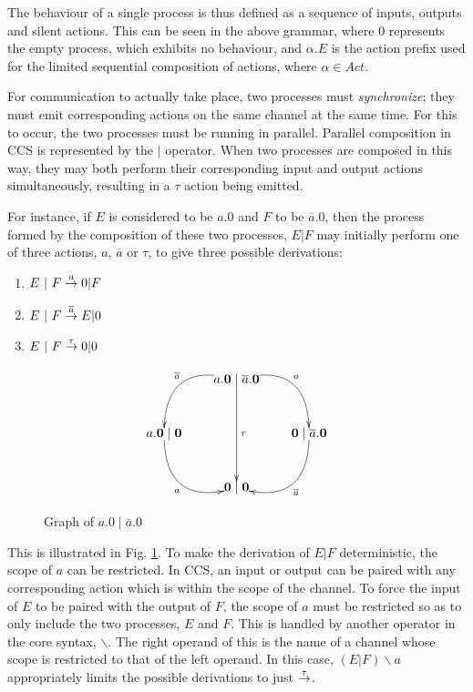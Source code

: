 The behaviour of a single process is thus defined as a sequence of
inputs, outputs and silent actions. This can be seen in the above
grammar, where $0$ represents the empty process, which exhibits no
behaviour, and $\alpha.E$ is the action prefix used for the limited
sequential composition of actions, where $\alpha \in Act$.

For communication to actually take place, two processes must
\emph{synchronize}; they must emit corresponding actions on the same
channel at the same time.  For this to occur, the two processes must be
running in parallel.  Parallel composition in CCS is represented by the
$|$ operator.  When two processes are composed in this way, they may
both perform their corresponding input and output actions
simultaneously, resulting in a $\tau$ action being emitted.

For instance, if $E$ is considered to be $a.0$ and $F$ to be
$\overline{a}.0$, then the process formed by the composition of these
two processes, $E|F$ may initially perform one of three actions, $a$,
$\overline{a}$ or $\tau$, to give three possible derivations:

\begin{enumerate}
\item $E\ |\ F \stackrel{a}{\rightarrow} 0|F$
\item $E\ |\ F \stackrel{\overline{a}}{\rightarrow} E|0$
\item $E\ |\ F \stackrel{\tau}{\rightarrow} 0|0$
\end{enumerate}

\begin{figure}  
  \centering
\[
\xy
(20,0)*{a.\nil \mid \overline{a}.\nil}="1";
(0,-15)*{a.\nil \mid \nil}="2";
(40,-15)*{\nil \mid \overline{a}.\nil}="3";
(20,-30)*{\nil \mid \nil}="4";
{\ar@/^2pc/^{a} "1";"3"};
{\ar@/_2pc/_{\overline{a}} "1";"2"};
{\ar@/^2pc/^{\overline{a}} "3";"4"};
{\ar@/_2pc/_{a} "2";"4"};
{\ar^{\tau} "1";"4"};
\endxy
\]
  \caption{Graph of $a.0 \mid \overline{a}.0$}
  \label{fig:graph1}
\end{figure}

This is illustrated in Fig. \ref{fig:graph1}.  To make the derivation
of $E|F$ deterministic, the scope of $a$ can be restricted.  In CCS,
an input or output can be paired with any corresponding action which
is within the scope of the channel.  To force the input of $E$ to be
paired with the output of $F$, the scope of $a$ must be restricted so
as to only include the two processes, $E$ and $F$.  This is handled by
another operator in the core syntax, $\backslash$.  The right operand
of this is the name of a channel whose scope is restricted to that of
the left operand.  In this case, $(E|F)\backslash a$ appropriately
limits the possible derivations to just $\stackrel{\tau}{\rightarrow}$.

